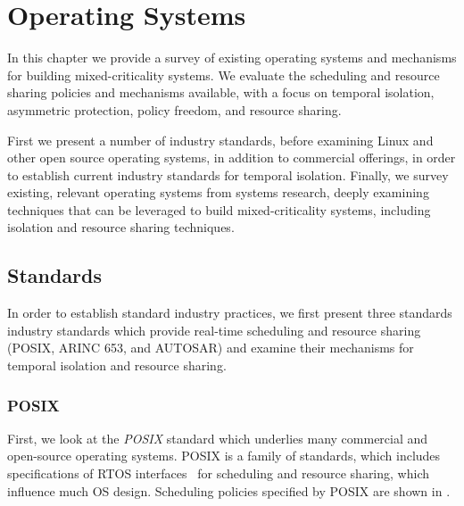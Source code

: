 

\chapter{Operating Systems}
\label{chap:operating-systems}

In this chapter we provide a survey of existing operating systems and mechanisms for building
mixed-criticality systems. We evaluate
the scheduling and resource sharing policies and mechanisms available, with a focus on temporal isolation,
asymmetric protection, policy freedom, and resource sharing.  

First we present a number of industry standards, before examining
Linux and other open source operating systems, in addition to
commercial offerings, in order to establish current industry standards for temporal isolation.
Finally, we survey existing, relevant operating systems
from systems research, deeply examining techniques that can be leveraged to build mixed-criticality
systems, including isolation and resource sharing techniques.

\section{Standards}

In order to establish standard industry practices, we first present three standards industry
standards which provide real-time scheduling and resource sharing (POSIX, ARINC
653, and AUTOSAR) and examine their mechanisms for temporal isolation and resource sharing.

\subsection{POSIX}

First, we look at the \emph{\gls{POSIX}} standard which underlies many commercial and open-source operating
systems. 
\gls{POSIX} is a family of standards, which includes specifications of \gls{RTOS} interfaces~\citep{Harbour_93} for scheduling and
resource sharing, which
influence much \gls{OS} design.  Scheduling policies specified by \gls{POSIX} are shown in
. 

